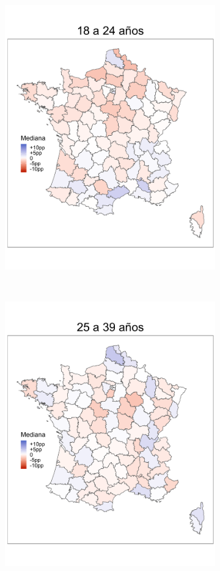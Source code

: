 \begin{figure}
\begin{subfigure}{0.3\textwidth}
	\includegraphics[width = \textwidth]{Figs/Efectos/Mapa_Efectos_Ed2_Modelo_H}
	\end{subfigure}
	~
	\begin{subfigure}{0.3\textwidth}
	\includegraphics[width = \textwidth]{Figs/Efectos/Mapa_Efectos_Ed3_Modelo_H}

\end{subfigure}
\end{figure}
